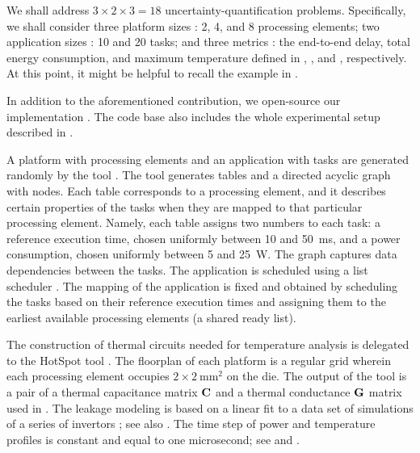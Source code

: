 We shall address $3 \times 2 \times 3 = 18$ uncertainty-quantification problems.
Specifically, we shall consider three platform sizes \np: 2, 4, and 8 processing
elements; two application sizes \nt: 10 and 20 tasks; and three metrics \g: the
end-to-end delay, total energy consumption, and maximum temperature defined in
, , and ,
respectively. At this point, it might be helpful to recall the example in
.

In addition to the aforementioned contribution, we open-source our
implementation \cite{sources}. The code base also includes the whole
experimental setup described in .


A platform with \np processing elements and an application with \nt tasks are
generated randomly by the  tool \cite{dick1998}. The tool generates \np
tables and a directed acyclic graph with \nt nodes. Each table corresponds to a
processing element, and it describes certain properties of the tasks when they
are mapped to that particular processing element. Namely, each table assigns two
numbers to each task: a reference execution time, chosen uniformly between 10
and 50~ms, and a power consumption, chosen uniformly between 5 and 25~W. The
graph captures data dependencies between the tasks. The application is scheduled
using a list scheduler \cite{adam1974}. The mapping of the application is fixed
and obtained by scheduling the tasks based on their reference execution times
and assigning them to the earliest available processing elements (a shared ready
list).

The construction of thermal  circuits needed for temperature analysis is
delegated to the HotSpot tool \cite{skadron2003}. The floorplan of each platform
is a regular grid wherein each processing element occupies $2 \times
2~\text{mm}^2$ on the die. The output of the tool is a pair of a thermal
capacitance matrix $\mathbf{C}$ and a thermal conductance $\mathbf{G}$ matrix used in
. The leakage modeling is based on a linear fit to a data
set of  simulations of a series of  invertors
\cite{ukhov2012, liu2007}; see also \cite{ukhov2014}. The time step of power and
temperature profiles is constant and equal to one microsecond; see 
and .

